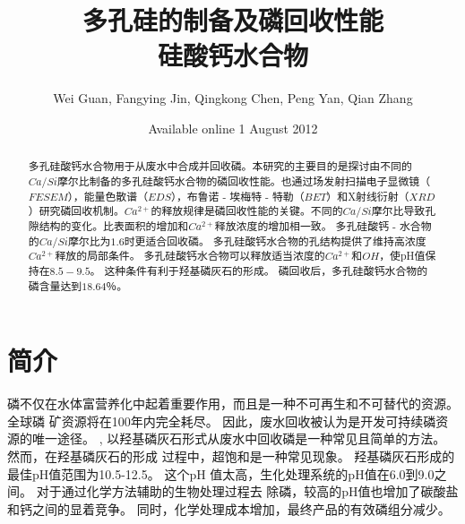 \documentclass[11pt]{article}
\author{Wei Guan, Fangying Jin, Qingkong Chen, Peng Yan, Qian Zhang}
\date{Available online 1 August 2012}
\title{多孔硅的制备及磷回收性能\\\medskip
\large 硅酸钙水合物}
\begin{document}
\maketitle
\tableofcontents

\begin{abstract}

多孔硅酸钙水合物用于从废水中合成并回收磷。本研究的主要目的是探讨由不同的$Ca/Si$摩尔比制备的多孔硅酸钙水合物的磷回收性能。也通过场发射扫描电子显微镜（$FESEM$），能量色散谱（$EDS$），布鲁诺 - 埃梅特 - 特勒（$BET$）和X射线衍射（$XRD$）研究磷回收机制。$Ca^{2+}$的释放规律是磷回收性能的关键。不同的$Ca/Si$摩尔比导致孔隙结构的变化。比表面积的增加和$Ca^{2+}$释放浓度的增加相一致。 多孔硅酸钙 - 水合物的$Ca/Si$摩尔比为$1.6$时更适合回收磷。 多孔硅酸钙水合物的孔结构提供了维持高浓度$Ca^{2+}$释放的局部条件。 多孔硅酸钙水合物可以释放适当浓度的$Ca^{2+}$和$OH$，使pH值保持在$8.5-9.5$。 这种条件有利于羟基磷灰石的形成。 磷回收后，多孔硅酸钙水合物的磷含量达到$18.64％$。

\end{abstract}

\section{简介}
\label{sec:orgc686a7c}
磷不仅在水体富营养化中起着重要作用，而且是一种不可再生和不可替代的资源。\cite{Suzuki_2007} 全球磷
矿资源将在100年内完全耗尽。 因此，废水回收被认为是开发可持续磷资源的唯一途径。
\cite{Efficiency_and_mechanism_of_phosphorus_removal_by_coagulation_of_iron_manganese_composited_oxide}, \cite{song07_seed_selec_cryst_calcium_phosp_phosp_recov}
以羟基磷灰石形式从废水中回收磷是一种常见且简单的方法。
\cite{chen09_phosp_remov_recov_throug_cryst,muench01_contr_struv_cryst_remov_phosp,song06_calcit_seeded_cryst_calcium_phosp_phosp_recov,song06_calcit_seeded_cryst_calcium_phosp_phosp_recov}
然而，在羟基磷灰石的形成
过程中，超饱和是一种常见现象。 羟基磷灰石形成的最佳pH值范围为10.5-12.5。\cite{liu03_influen_ph_temper_morph_hydrox} 这个pH
值太高，生化处理系统的pH值在6.0到9.0之间。\cite{hood01_bioch_hypot_explain_respon_enhan} 对于通过化学方法辅助的生物处理过程去
除磷，较高的pH值也增加了碳酸盐和钙之间的显着竞争。\cite{battistoni00_struv_cryst}
同时，化学处理成本增加，最终产品的有效磷组分减少。\cite{sengupta11_selec_remov_phosp_from_wastew}
\end{document}
